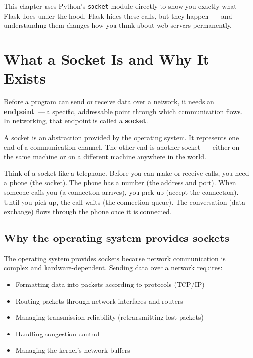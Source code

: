 \noindent{}This chapter uses Python's \texttt{socket} module directly to show you exactly what Flask does under the hood. Flask hides these calls, but they happen~--- and understanding them changes how you think about web servers permanently.

\setcounter{section}{0}
\section{What a Socket Is and Why It Exists}\label{03-network-capability:31-what-a-socket-is-and-why-it-exists}

Before a program can send or receive data over a network, it needs an \textbf{endpoint}~--- a specific, addressable point through which communication flows. In networking, that endpoint is called a \textbf{socket}.

A socket is an abstraction provided by the operating system. It represents one end of a communication channel. The other end is another socket~--- either on the same machine or on a different machine anywhere in the world.

Think of a socket like a telephone. Before you can make or receive calls, you need a phone (the socket). The phone has a number (the address and port). When someone calls you (a connection arrives), you pick up (accept the connection). Until you pick up, the call waits (the connection queue). The conversation (data exchange) flows through the phone once it is connected.

\subsection*{Why the operating system provides sockets}\label{03-network-capability:why-the-operating-system-provides-sockets}

The operating system provides sockets because network communication is complex and hardware-dependent. Sending data over a network requires:

\begin{itemize}
\tightlist
\item
  Formatting data into packets according to protocols (TCP/IP)
\item
  Routing packets through network interfaces and routers
\item
  Managing transmission reliability (retransmitting lost packets)
\item
  Handling congestion control
\item
  Managing the kernel's network buffers
\end{itemize}

